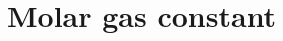 \hypertarget{group___molar_gas_constant}{}\section{Molar gas constant}
\label{group___molar_gas_constant}
